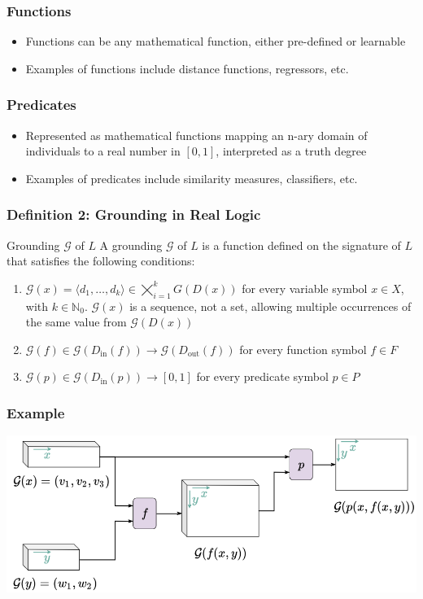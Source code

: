 \documentclass{beamer}
\newcommand{\G}{\mathcal{G}}
\begin{document}
\begin{frame}
\frametitle{Functions}
\begin{itemize}
    \item Functions can be any mathematical function, either
      pre-defined or learnable
    \item Examples of functions include distance functions,
      regressors, etc.
\end{itemize}
\end{frame}

\begin{frame}
\frametitle{Predicates}
\begin{itemize}
    \item Represented as mathematical functions mapping an n-ary
      domain of individuals to a real number in \([0,1]\), interpreted
      as a truth degree
    \item Examples of predicates include similarity measures,
      classifiers, etc.
\end{itemize}
\end{frame}

\begin{frame}
\frametitle{Definition 2: Grounding in Real Logic}
\begin{block}{Grounding \( \G \) of \( L \)}
A grounding $\G$ of \( L \) is a function defined on the signature of \( L \) that satisfies the following conditions:
\begin{enumerate}
    \item \( \G(x) = \langle d_1, \ldots, d_k \rangle \in
      \bigtimes_{i=1}^{k} G(D(x)) \) for every variable symbol \( x
      \in X \), with \( k \in \mathbb{N}_0 \). \( \G(x) \) is a
      sequence, not a set, allowing multiple occurrences of the same
      value from \( \G(D(x)) \)
    \item \( \G(f) \in \G(D_{\text{in}}(f)) \rightarrow
      \G(D_{\text{out}}(f)) \) for every function symbol \( f \in F
      \)
    \item \( \G(p) \in \G(D_{\text{in}}(p)) \rightarrow [0, 1] \) for
      every predicate symbol \( p \in P \)
\end{enumerate}
\end{block}
\end{frame}

\begin{frame}
  \frametitle{Example}
  \includegraphics[width=\textwidth]{ltn1.png}
\end{frame}
\end{document}
